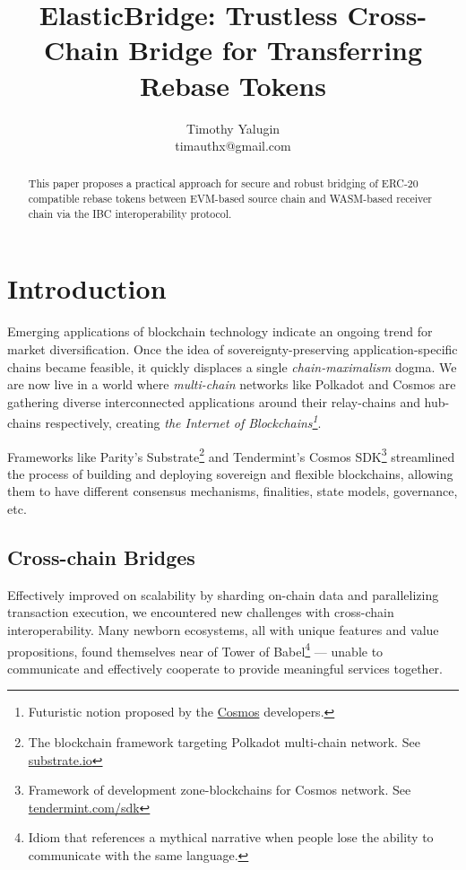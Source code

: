 \documentclass{article}
\title{ElasticBridge: Trustless Cross-Chain Bridge for Transferring Rebase Tokens}
\author{Timothy Yalugin\\timauthx@gmail.com}
\begin{document}
\maketitle

\begin{abstract}

This paper proposes a practical approach for secure and robust bridging of ERC-20 compatible rebase tokens between EVM-based source chain and WASM-based receiver chain via the IBC interoperability protocol.

\end{abstract}

\section{Introduction}

Emerging applications of blockchain technology indicate an ongoing trend for market diversification. Once the idea of sovereignty-preserving application-specific chains became feasible, it quickly displaces a single \textit{chain-maximalism} dogma. We are now live in a world where \textit{multi-chain} networks like Polkadot \cite{wood2016polkadot} and Cosmos \cite{kwon2016cosmos} are gathering diverse interconnected applications around their relay-chains and hub-chains respectively, creating \textit{the Internet of Blockchains\footnote{Futuristic notion proposed by the \href{https://cosmos.network}{Cosmos} developers.}}.

Frameworks like Parity's Substrate\footnote{The blockchain framework
targeting Polkadot multi-chain network. See \href{https://substrate.io}{substrate.io}} and Tendermint's Cosmos SDK\footnote{Framework of development zone-blockchains for Cosmos network. See \href{https://tendermint.com/sdk}{tendermint.com/sdk}} streamlined the process of building and deploying sovereign and flexible blockchains, allowing them to have different consensus mechanisms, finalities, state models, governance, etc.

\subsection{Cross-chain Bridges}

Effectively improved on scalability by sharding on-chain data and parallelizing transaction execution, we encountered new challenges with cross-chain interoperability. Many newborn ecosystems, all with unique features and value propositions, found themselves near of Tower of Babel\footnote{Idiom that references a mythical narrative when people lose the ability to communicate with the same language. } --- unable to communicate and effectively cooperate to provide meaningful services together.
\end{document}
